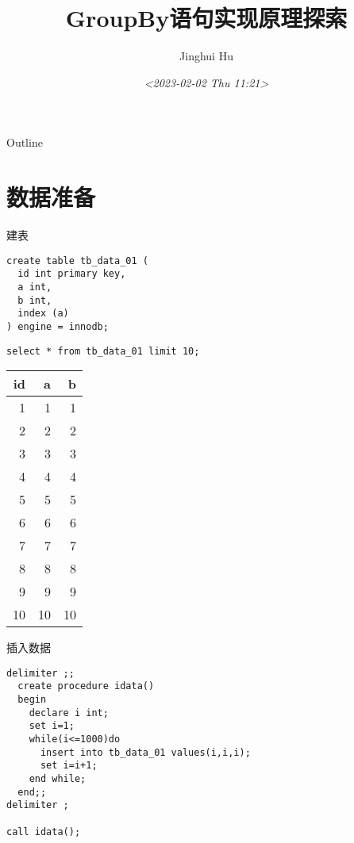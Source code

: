 \documentclass[presentation]{beamer}
\author{Jinghui Hu}
\date{\textit{<2023-02-02 Thu 11:21>}}
\title{GroupBy语句实现原理探索}
\begin{document}
\maketitle
\begin{frame}{Outline}
\tableofcontents
\end{frame}



\section{数据准备}
\label{sec:org827e8a0}
\begin{frame}[label={sec:org039b5e1},fragile]{建表}
 \begin{verbatim}
create table tb_data_01 (
  id int primary key,
  a int,
  b int,
  index (a)
) engine = innodb;
\end{verbatim}

\begin{verbatim}
select * from tb_data_01 limit 10;
\end{verbatim}

\begin{center}
\begin{tabular}{rrr}
id & a & b\\
\hline
1 & 1 & 1\\
2 & 2 & 2\\
3 & 3 & 3\\
4 & 4 & 4\\
5 & 5 & 5\\
6 & 6 & 6\\
7 & 7 & 7\\
8 & 8 & 8\\
9 & 9 & 9\\
10 & 10 & 10\\
\end{tabular}
\end{center}
\end{frame}
\begin{frame}[label={sec:org4becff4},fragile]{插入数据}
 \begin{verbatim}
delimiter ;;
  create procedure idata()
  begin
    declare i int;
    set i=1;
    while(i<=1000)do
      insert into tb_data_01 values(i,i,i);
      set i=i+1;
    end while;
  end;;
delimiter ;

call idata();
\end{verbatim}
\end{frame}
\end{document}
